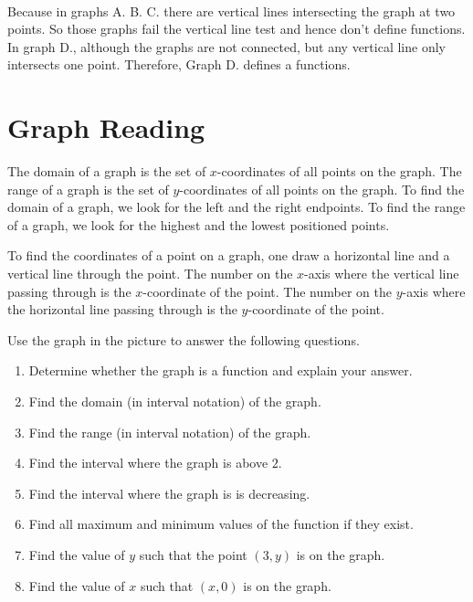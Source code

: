 \documentclass[en,11pt]{elegantbook}
\let\BeginKnitrBlock\begin \let\EndKnitrBlock\end
\begin{document}
\BeginKnitrBlock{solution}
{}\\

Because in graphs A. B. C. there are vertical lines intersecting the graph at two points. So those graphs fail the vertical line test and hence don't define functions. In graph D., although the graphs are not connected, but any vertical line only intersects one point. Therefore, Graph D. defines a functions.
\EndKnitrBlock{solution}

\hypertarget{graph-reading}{%
\section{Graph Reading}\label{graph-reading}}

The domain of a graph is the set of \(x\)-coordinates of all points on the graph. The range of a graph is the set of \(y\)-coordinates of all points on the graph. To find the domain of a graph, we look for the left and the right endpoints. To find the range of a graph, we look for the highest and the lowest positioned points.

To find the coordinates of a point on a graph, one draw a horizontal line and a vertical line through the point. The number on the \(x\)-axis where the vertical line passing through is the \(x\)-coordinate of the point. The number on the \(y\)-axis where the horizontal line passing through is the \(y\)-coordinate of the point.

\BeginKnitrBlock{example}
\protect\hypertarget{exm:unnamed-chunk-222}{}{\label{exm:unnamed-chunk-222} }
Use the graph in the picture to answer the following questions.

\begin{enumerate}
\def\labelenumi{\arabic{enumi}.}

\item
  Determine whether the graph is a function and explain your answer.
\item
  Find the domain (in interval notation) of the graph.
\item
  Find the range (in interval notation) of the graph.
\item
  Find the interval where the graph is above \(2\).
\item
  Find the interval where the graph is is decreasing.
\item
  Find all maximum and minimum values of the function if they exist.
\item
  Find the value of \(y\) such that the point \((3, y)\) is on the graph.
\item
  Find the value of \(x\) such that \((x, 0)\) is on the graph.
\end{enumerate}
\EndKnitrBlock{example}
\end{document}
